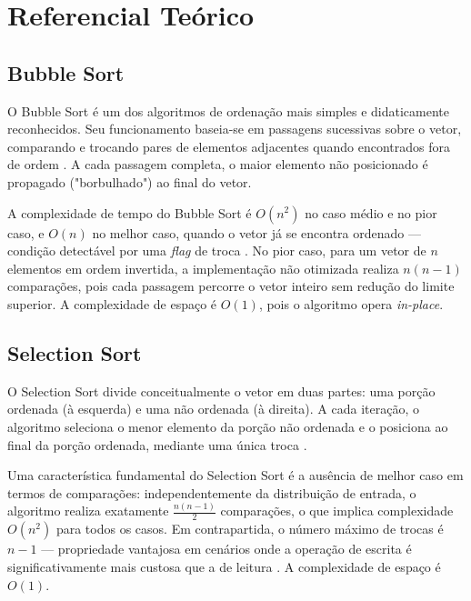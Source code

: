 \documentclass[12pt]{article}
\begin{document}
\section{Referencial Teórico}
\label{sec:theory}

\subsection{Bubble Sort}

O Bubble Sort é um dos algoritmos de ordenação mais simples e
didaticamente reconhecidos. Seu funcionamento baseia-se em
passagens sucessivas sobre o vetor, comparando e trocando
pares de elementos adjacentes quando encontrados fora de ordem
\cite{cormen2009}. A cada passagem completa, o maior elemento
não posicionado é propagado ("borbulhado") ao final do vetor.

A complexidade de tempo do Bubble Sort é $O(n^2)$ no caso médio
e no pior caso, e $O(n)$ no melhor caso, quando o vetor já se
encontra ordenado — condição detectável por uma \textit{flag}
de troca \cite{cormen2009}. No pior caso, para um vetor de $n$
elementos em ordem invertida, a implementação não otimizada
realiza $n(n-1)$ comparações, pois cada passagem percorre
o vetor inteiro sem redução do limite superior. A complexidade
de espaço é $O(1)$, pois o algoritmo opera \textit{in-place}.

\subsection{Selection Sort}

O Selection Sort divide conceitualmente o vetor em duas partes:
uma porção ordenada (à esquerda) e uma não ordenada (à direita).
A cada iteração, o algoritmo seleciona o menor elemento da
porção não ordenada e o posiciona ao final da porção ordenada,
mediante uma única troca \cite{cormen2009}.

Uma característica fundamental do Selection Sort é a ausência
de melhor caso em termos de comparações: independentemente
da distribuição de entrada, o algoritmo realiza exatamente
$\frac{n(n-1)}{2}$ comparações, o que implica complexidade
$O(n^2)$ para todos os casos. Em contrapartida, o número
máximo de trocas é $n-1$ — propriedade vantajosa em cenários
onde a operação de escrita é significativamente mais custosa
que a de leitura \cite{knuth1998}. A complexidade de espaço
é $O(1)$.
\end{document}
